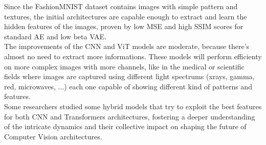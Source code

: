 \documentclass[preprint]{main}
\begin{document}
Since the FashionMNIST dataset contains images with simple pattern and textures, the initial architectures are capable enough to extract and learn the hidden features of the images, proven by low MSE and high SSIM scores for standard AE and low beta VAE. \\
The improvements of the CNN and ViT models are moderate, because there's almost no need to extract more informations.
These models will perform efficienty on more complex images with more channels, like in the medical or scientific fields where images are captured using different light spectrums (xrays, gamma, red, microwaves, ...) each one capable of showing different kind of patterns and features. \\
Some researchers \cite{Haruna_2025} studied some hybrid models that try to exploit the best features for both CNN and Transformers architectures, fostering a deeper understanding of the intricate dynamics and their collective impact on shaping the future of Computer Vision architectures. \\



\newpage

\printbibliography %
  
\end{document}
